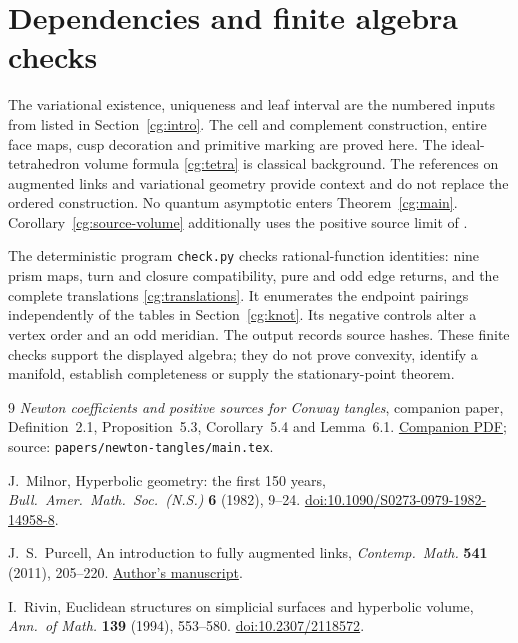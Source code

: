 \section{Dependencies and finite algebra checks}\label{cg:checks}

The variational existence, uniqueness and leaf interval are the
numbered inputs from \cite{Newton} listed in Section~\ref{cg:intro}.
The cell and complement construction, entire face maps, cusp
decoration and primitive marking are proved here.
The ideal-tetrahedron volume formula \eqref{cg:tetra} is classical
background. The references on augmented links and variational
geometry provide context and do not replace the ordered construction.
No quantum asymptotic enters Theorem~\ref{cg:main}.
Corollary~\ref{cg:source-volume} additionally uses the positive
source limit of \cite[Corollary~5.4]{Newton}.

The deterministic program \texttt{check.py} checks rational-function
identities: nine prism maps, turn and closure compatibility, pure
and odd edge returns, and the complete translations
\eqref{cg:translations}. It enumerates the endpoint pairings
independently of the tables in Section~\ref{cg:knot}. Its negative
controls alter a vertex order and an odd meridian. The output
records source hashes. These finite checks support the displayed
algebra; they do not prove convexity, identify a manifold, establish
completeness or supply the stationary-point theorem.

\begin{thebibliography}{9}
\emph{Newton coefficients and positive sources for Conway tangles},
companion paper, Definition~2.1, Proposition~5.3,
Corollary~5.4 and Lemma~6.1.
\href{https://sashakolpakov.github.io/murakamis_dream/papers/newton-tangles.pdf}
{Companion PDF}; source: \texttt{papers/newton-tangles/main.tex}.

J.~Milnor, Hyperbolic geometry: the first 150 years,
\emph{Bull.\ Amer.\ Math.\ Soc.\ (N.S.)} \textbf{6} (1982), 9--24.
\href{https://doi.org/10.1090/S0273-0979-1982-14958-8}
{doi:10.1090/S0273-0979-1982-14958-8}.

J.~S.~Purcell, An introduction to fully augmented links,
\emph{Contemp.\ Math.} \textbf{541} (2011), 205--220.
\href{https://users.monash.edu.au/~jpurcell/papers/expos-auglinks.pdf}
{Author's manuscript}.

I.~Rivin, Euclidean structures on simplicial surfaces and hyperbolic
volume, \emph{Ann.\ of Math.} \textbf{139} (1994), 553--580.
\href{https://doi.org/10.2307/2118572}{doi:10.2307/2118572}.
\end{thebibliography}
